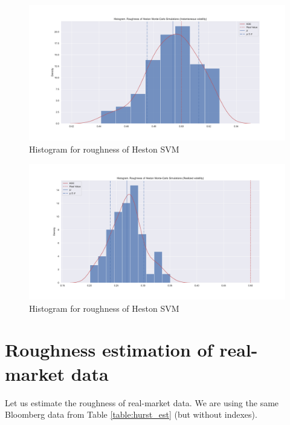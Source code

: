     \begin{figure}[htbp]
        \centering
        \includegraphics[width=\linewidth]{fig/Histogram. Roughness of Heston Monte-Carlo Simulations (Instantaneous volatility).pdf}
        \caption{Histogram for roughness of Heston SVM}
    \end{figure}
    \begin{figure}[htbp]
        \centering
        \includegraphics[width=\linewidth]{fig/Histogram. Roughness of Heston Monte-Carlo Simulations (Realized volatility).pdf}
        \caption{Histogram for roughness of Heston SVM}
    \end{figure}

\section{Roughness estimation of real-market data}

    Let us estimate the roughness of real-market data. 
    We are using the same Bloomberg data from Table \ref{table:hurst_est} (but without indexes).

